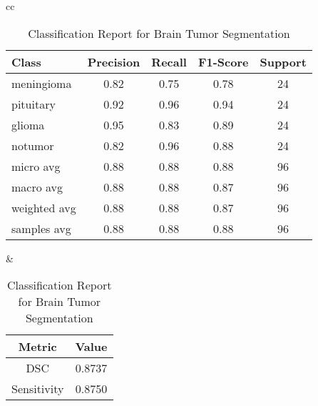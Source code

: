\begin{table}[ht]
\centering
\begin{tabular}{cc}
    \begin{minipage}{.6\linewidth}
        \centering
        \begin{subtable}[t]{\linewidth}
            \centering
            \begin{tabular}{|l|c|c|c|c|}
                \hline 
                \textbf{Class} & \textbf{Precision} & \textbf{Recall} & \textbf{F1-Score} & \textbf{Support} \\ 
                \hline 
                meningioma & 0.82 & 0.75 & 0.78 & 24 \\ 
                \hline
                pituitary  & 0.92 & 0.96 & 0.94 & 24 \\ 
                \hline
                glioma     & 0.95 & 0.83 & 0.89 & 24 \\ 
                \hline
                notumor    & 0.82 & 0.96 & 0.88 & 24 \\ 
                \hline
                micro avg  & 0.88 & 0.88 & 0.88 & 96 \\ 
                \hline
                macro avg  & 0.88 & 0.88 & 0.87 & 96 \\ 
                \hline
                weighted avg & 0.88 & 0.88 & 0.87 & 96 \\ 
                \hline
                samples avg & 0.88 & 0.88 & 0.88 & 96 \\ 
                \hline
            \end{tabular}
            \caption{Classification Report for Brain Tumor Segmentation} 
            \label{tab:densenet121_classification_report}
        \end{subtable}
    \end{minipage} &
    \begin{minipage}{.35\linewidth}
        \centering
        \begin{subtable}[t]{\linewidth}
            \centering
            \begin{tabular}{|c|c|}
                \hline 
                \textbf{Metric} & \textbf{Value} \\ 
                \hline
                DSC & 0.8737 \\ 
                \hline
                Sensitivity & 0.8750 \\ 

\end{tabular}
\end{subtable}
\end{minipage}
\end{tabular}
\end{table}
